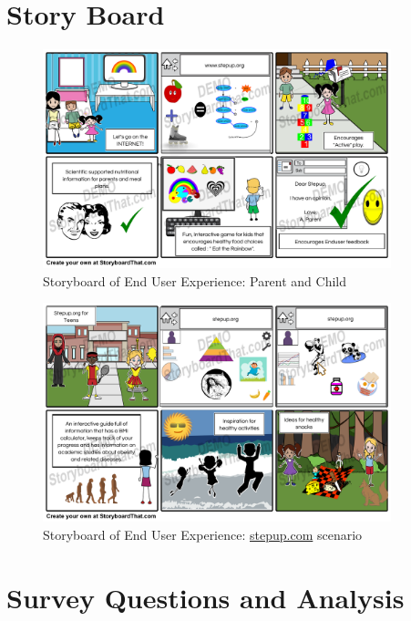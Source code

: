 \documentclass[letterpaper,12pt]{article}
\begin{document}
\section{Story Board}

\begin{figure}[ht!]
  \centering
  \includegraphics[width=0.9\textwidth]{assets/jpg/parent_and_children_experience}
  \caption{Storyboard of End User Experience: Parent and Child}
  \label{fig:parent-and-children-experience}
\end{figure}
\FloatBarrier
\begin{figure}[ht!]
  \centering
  \includegraphics[width=0.9\textwidth]{assets/jpg/stepup_com_scenario_2}
  \caption{Storyboard of End User Experience: \url{stepup.com} scenario}
  \label{fig:stepup-com-scenario-2}
\end{figure}
\FloatBarrier

\section{Survey Questions and Analysis}
\end{document}
